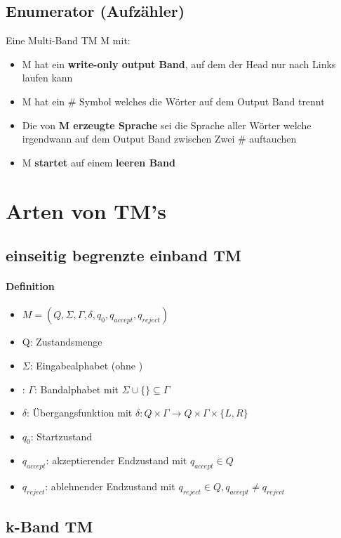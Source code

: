 \documentclass[12pt,a4paper]{article}
\begin{document}
\subsection{Enumerator (Aufzähler)}
Eine Multi-Band TM M mit:
\begin{itemize}
\item M hat ein \textbf{write-only output Band}, auf dem der Head nur nach Links laufen kann
\item M hat ein $\#$ Symbol welches die Wörter auf dem Output Band trennt
\item Die von \textbf{M erzeugte Sprache} sei die Sprache aller Wörter welche irgendwann auf dem Output Band zwischen Zwei $\#$ auftauchen
\item M \textbf{startet} auf einem \textbf{leeren Band}
\end{itemize}

\section{Arten von TM's}
\subsection{einseitig begrenzte einband TM}
\paragraph{Definition}
\flushleft
\begin{itemize}
\item $M=(Q, \Sigma, \Gamma, \delta, q_0, q_{accept}, q_{reject})$
\item Q: Zustandsmenge
\item $\Sigma$: Eingabealphabet (ohne \textvisiblespace)
\item: $\Gamma$: Bandalphabet mit $\Sigma \cup \{$\textvisiblespace$\} \subseteq \Gamma$
\item $\delta$: Übergangsfunktion mit $\delta: Q \times \Gamma \rightarrow Q \times \Gamma \times \{L, R\}$
\item $q_0$: Startzustand
\item $q_{accept}$: akzeptierender Endzustand mit $q_{accept} \in Q$
\item $q_{reject}$: ablehnender Endzustand mit $q_{reject} \in Q, q_{accept} \neq q_{reject}$
\end{itemize}

\subsection{k-Band TM}
\end{document}
